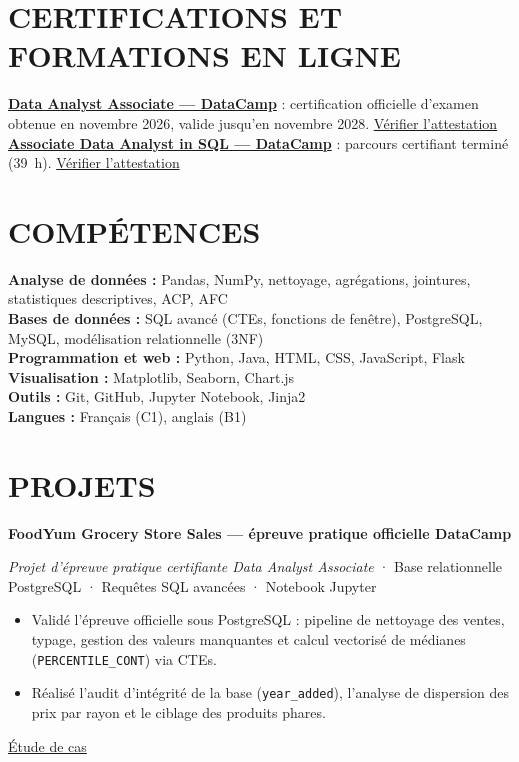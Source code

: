\documentclass[a4paper,10pt]{article}
\newcommand{\projectEntry}[3]{%
  \noindent\textbf{#1}\par
  {\small\textcolor{gris}{\textit{#2} · #3}}\par
  \vspace{2pt}%
}
\newcommand{\compactListStart}{%
  \begin{itemize}[topsep=1pt,itemsep=0pt,parsep=0pt,partopsep=0pt,leftmargin=1.3em]
}
\newcommand{\compactListEnd}{\end{itemize}}
\begin{document}
\section{CERTIFICATIONS ET FORMATIONS EN LIGNE}

{\small
\textbf{\href{https://www.datacamp.com/certificate/DAA0010708616816}{Data Analyst Associate — DataCamp}} : certification officielle d'examen obtenue en novembre 2026, valide jusqu’en novembre 2028. \hfill \href{https://www.datacamp.com/certificate/DAA0010708616816}{Vérifier l’attestation}\\
\textbf{\href{https://www.datacamp.com/completed/statement-of-accomplishment/track/792469f86f6275d924983bafc60c0de90da86477}{Associate Data Analyst in SQL — DataCamp}} : parcours certifiant terminé (39~h). \hfill \href{https://www.datacamp.com/completed/statement-of-accomplishment/track/792469f86f6275d924983bafc60c0de90da86477}{Vérifier l’attestation}
}

\section{COMPÉTENCES}

{\small
\textbf{Analyse de données :} Pandas, NumPy, nettoyage, agrégations, jointures, statistiques descriptives, ACP, AFC\\
\textbf{Bases de données :} SQL avancé (CTEs, fonctions de fenêtre), PostgreSQL, MySQL, modélisation relationnelle (3NF)\\
\textbf{Programmation et web :} Python, Java, HTML, CSS, JavaScript, Flask\\
\textbf{Visualisation :} Matplotlib, Seaborn, Chart.js\\
\textbf{Outils :} Git, GitHub, Jupyter Notebook, Jinja2\\
\textbf{Langues :} Français (C1), anglais (B1)
}

\section{PROJETS}

\projectEntry
  {FoodYum Grocery Store Sales — épreuve pratique officielle DataCamp}
  {Projet d’épreuve pratique certifiante Data Analyst Associate}
  {Base relationnelle PostgreSQL · Requêtes SQL avancées · Notebook Jupyter}
\compactListStart
  \item Validé l’épreuve officielle sous PostgreSQL : pipeline de nettoyage des ventes, typage, gestion des valeurs manquantes et calcul vectorisé de médianes (\texttt{PERCENTILE\_CONT}) via CTEs.
  \item Réalisé l’audit d’intégrité de la base (\texttt{year\_added}), l’analyse de dispersion des prix par rayon et le ciblage des produits phares.
\compactListEnd
{\footnotesize\hfill \href{https://godwin-elie-portfolio.vercel.app/projets/grocery-store-sales}{Étude de cas}}
\end{document}
